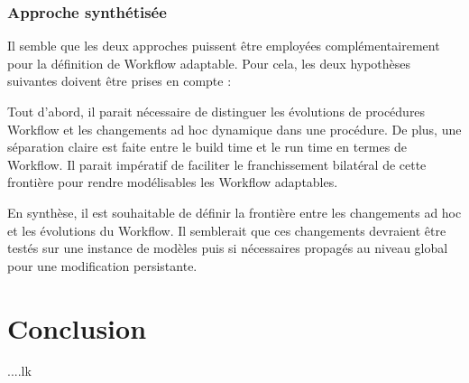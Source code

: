 { 	\subsubsection{ Approche synthétisée}
 	Il semble que les deux approches puissent être employées complémentairement pour la définition de Workflow adaptable. Pour cela, les deux hypothèses suivantes doivent être prises en compte :
 	
 	Tout d’abord, il parait nécessaire de distinguer les évolutions de procédures Workflow et les changements ad hoc dynamique dans une procédure. De plus, une séparation claire est faite entre le build time et le run time en termes de Workflow. Il parait impératif de faciliter le franchissement bilatéral de cette frontière pour rendre modélisables les Workflow adaptables.
 	
 	En synthèse, il est souhaitable de définir la frontière entre les changements ad hoc et les évolutions du Workflow. Il semblerait que ces changements devraient être testés sur une instance de modèles puis si nécessaires propagés au niveau global pour une modification persistante.
 } 
\section{Conclusion}
....lk

